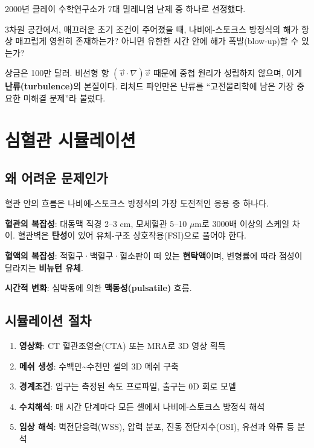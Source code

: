 \documentclass[11pt,a4paper]{article}
\begin{document}
2000년 클레이 수학연구소가 7대 밀레니엄 난제 중 하나로 선정했다.

\begin{quotebox}
3차원 공간에서, 매끄러운 초기 조건이 주어졌을 때, 나비에-스토크스 방정식의 해가 항상 매끄럽게 영원히 존재하는가? 아니면 유한한 시간 안에 해가 폭발(blow-up)할 수 있는가?
\end{quotebox}

상금은 100만 달러. 비선형 항 $(\vec{v} \cdot \nabla)\vec{v}$ 때문에 중첩 원리가 성립하지 않으며, 이게 \textbf{난류(turbulence)}의 본질이다. 리처드 파인만은 난류를 ``고전물리학에 남은 가장 중요한 미해결 문제''라 불렀다.

\section{심혈관 시뮬레이션}

\subsection{왜 어려운 문제인가}

혈관 안의 흐름은 나비에-스토크스 방정식의 가장 도전적인 응용 중 하나다.

\textbf{혈관의 복잡성}: 대동맥 직경 2--3 cm, 모세혈관 5--10 $\mu$m로 3000배 이상의 스케일 차이. 혈관벽은 \textbf{탄성}이 있어 유체-구조 상호작용(FSI)으로 풀어야 한다.

\textbf{혈액의 복잡성}: 적혈구·백혈구·혈소판이 떠 있는 \textbf{현탁액}이며, 변형률에 따라 점성이 달라지는 \textbf{비뉴턴 유체}.

\textbf{시간적 변화}: 심박동에 의한 \textbf{맥동성(pulsatile)} 흐름.

\subsection{시뮬레이션 절차}

\begin{enumerate}[leftmargin=*, itemsep=2pt]
  \item \textbf{영상화}: CT 혈관조영술(CTA) 또는 MRA로 3D 영상 획득
  \item \textbf{메쉬 생성}: 수백만\textasciitilde 수천만 셀의 3D 메쉬 구축
  \item \textbf{경계조건}: 입구는 측정된 속도 프로파일, 출구는 0D 회로 모델
  \item \textbf{수치해석}: 매 시간 단계마다 모든 셀에서 나비에-스토크스 방정식 해석
  \item \textbf{임상 해석}: 벽전단응력(WSS), 압력 분포, 진동 전단지수(OSI), 유선과 와류 등 분석
\end{enumerate}
\end{document}
